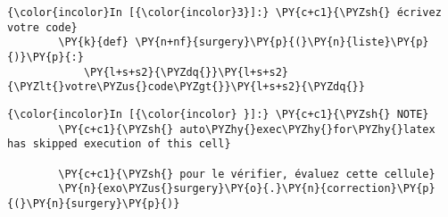     \begin{Verbatim}[commandchars=\\\{\}]
{\color{incolor}In [{\color{incolor}3}]:} \PY{c+c1}{\PYZsh{} écrivez votre code}
        \PY{k}{def} \PY{n+nf}{surgery}\PY{p}{(}\PY{n}{liste}\PY{p}{)}\PY{p}{:}
            \PY{l+s+s2}{\PYZdq{}}\PY{l+s+s2}{\PYZlt{}votre\PYZus{}code\PYZgt{}}\PY{l+s+s2}{\PYZdq{}}
\end{Verbatim}


    \begin{Verbatim}[commandchars=\\\{\}]
{\color{incolor}In [{\color{incolor} }]:} \PY{c+c1}{\PYZsh{} NOTE}
        \PY{c+c1}{\PYZsh{} auto\PYZhy{}exec\PYZhy{}for\PYZhy{}latex has skipped execution of this cell}
        
        \PY{c+c1}{\PYZsh{} pour le vérifier, évaluez cette cellule}
        \PY{n}{exo\PYZus{}surgery}\PY{o}{.}\PY{n}{correction}\PY{p}{(}\PY{n}{surgery}\PY{p}{)}
\end{Verbatim}



    
    
    
